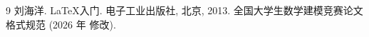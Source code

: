 \begin{thebibliography}{9}
     刘海洋.
    \newblock \LaTeX {}入门\allowbreak[J].
    \newblock 电子工业出版社, 北京, 2013.
     全国大学生数学建模竞赛论文格式规范 (2026 年 修改).
\end{thebibliography}
